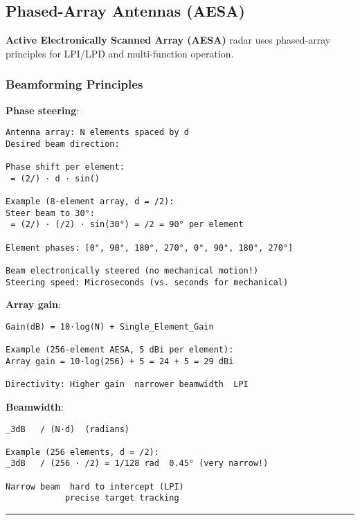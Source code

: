 \subsection{\texorpdfstring{ Phased-Array Antennas
(AESA)}{ Phased-Array Antennas (AESA)}}\label{phased-array-antennas-aesa}

\textbf{Active Electronically Scanned Array (AESA)} radar uses
phased-array principles for LPI/LPD and multi-function operation.

\subsubsection{Beamforming Principles}\label{beamforming-principles}

\textbf{Phase steering}:

\begin{verbatim}
Antenna array: N elements spaced by d
Desired beam direction: 

Phase shift per element:
 = (2/) · d · sin()

Example (8-element array, d = /2):
Steer beam to 30°:
 = (2/) · (/2) · sin(30°) = /2 = 90° per element

Element phases: [0°, 90°, 180°, 270°, 0°, 90°, 180°, 270°]

Beam electronically steered (no mechanical motion!)
Steering speed: Microseconds (vs. seconds for mechanical)
\end{verbatim}

\textbf{Array gain}:

\begin{verbatim}
Gain(dB) = 10·log(N) + Single_Element_Gain

Example (256-element AESA, 5 dBi per element):
Array gain = 10·log(256) + 5 = 24 + 5 = 29 dBi

Directivity: Higher gain  narrower beamwidth  LPI
\end{verbatim}

\textbf{Beamwidth}:

\begin{verbatim}
_3dB   / (N·d)  (radians)

Example (256 elements, d = /2):
_3dB   / (256 · /2) = 1/128 rad  0.45° (very narrow!)

Narrow beam  hard to intercept (LPI)
            precise target tracking
\end{verbatim}

\begin{center}\rule{0.5\linewidth}{0.5pt}\end{center}

